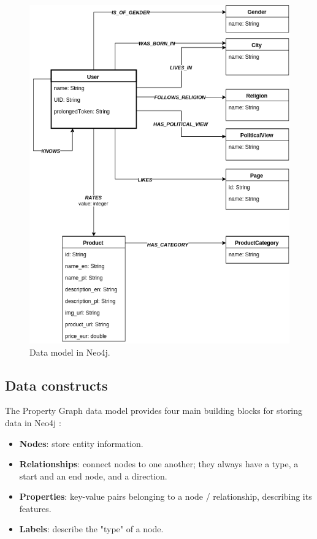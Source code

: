 \documentclass[12pt]{report}
\begin{document}
\begin{figure}[!t]
\centering
\includegraphics[width=\textwidth]{neo4j_data_model3.png} 
\caption[Data model in Neo4j.]{Data model in Neo4j.}
\label{fig.data_model}
\end{figure}

\subsection{Data constructs}

The Property Graph data model provides four main building blocks for storing data in Neo4j \cite{learning_neo4j}:
\begin{itemize}
\item {\bf Nodes}: store entity information.
\item {\bf Relationships}: connect nodes to one another; they always have a type, a start and an end node, and a direction.
\item {\bf Properties}: key-value pairs belonging to a node / relationship, describing its features.
\item {\bf Labels}: describe the "type" of a node.
\end{itemize}
\end{document}
